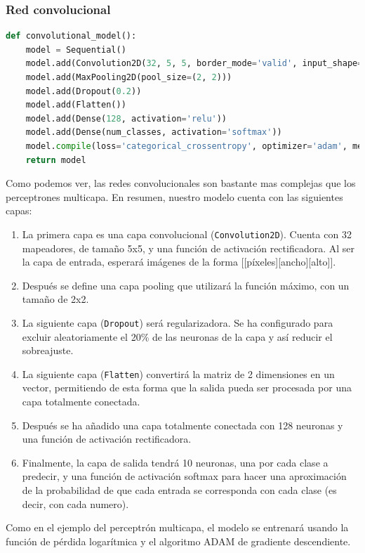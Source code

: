 \subsubsection{Red convolucional}
\begin{lstlisting}[language=Python]
def convolutional_model():
	model = Sequential()
	model.add(Convolution2D(32, 5, 5, border_mode='valid', input_shape=(1, 28, 28), activation='relu'))
	model.add(MaxPooling2D(pool_size=(2, 2)))
	model.add(Dropout(0.2))
	model.add(Flatten())
	model.add(Dense(128, activation='relu'))
	model.add(Dense(num_classes, activation='softmax'))
	model.compile(loss='categorical_crossentropy', optimizer='adam', metrics=['accuracy'])
	return model
\end{lstlisting}
Como podemos ver, las redes convolucionales son bastante mas complejas que los perceptrones multicapa. En resumen, nuestro modelo cuenta con las siguientes capas:\\
\begin{enumerate}
\item La primera capa es una capa convolucional (\lstinline{Convolution2D}). Cuenta con 32 mapeadores, de tamaño 5x5, y una función de activación rectificadora. Al ser la capa de entrada, esperará imágenes de la forma [[píxeles][ancho][alto]].
\item Después se define una capa pooling que utilizará la función máximo, con un tamaño de 2x2.\\
\item La siguiente capa (\lstinline{Dropout}) será regularizadora. Se ha configurado para excluir aleatoriamente el 20\% de las neuronas de la capa y así reducir el sobreajuste.\\
\item La siguiente capa (\lstinline{Flatten}) convertirá la matriz de 2 dimensiones en un vector, permitiendo de esta forma que la salida pueda ser procesada por una capa totalmente conectada.\\
\item Después se ha añadido una capa totalmente conectada con 128 neuronas y una función de activación rectificadora.\\
\item Finalmente, la capa de salida tendrá 10 neuronas, una por cada clase a predecir, y una función de activación softmax para hacer una aproximación de la probabilidad de que cada entrada se corresponda con cada clase (es decir, con cada numero).
\end{enumerate}
Como en el ejemplo del perceptrón multicapa, el modelo se entrenará usando la función de pérdida logarítmica y el algoritmo ADAM de gradiente descendiente.
